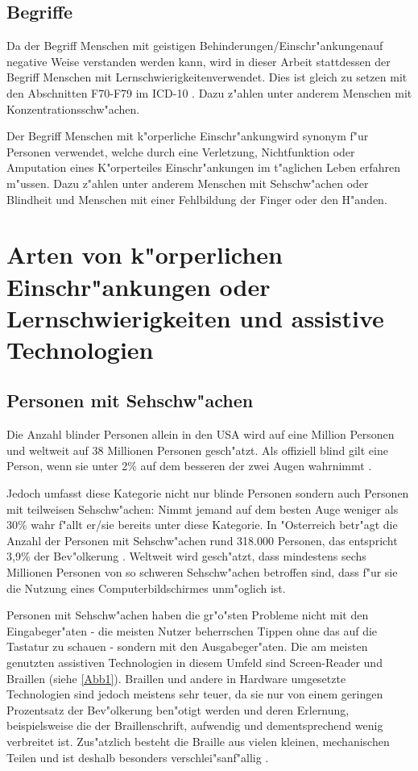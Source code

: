 \documentclass[a4paper,bibtotoc,oneside]{scrbook}
\begin{document}
\section{Begriffe}
Da der Begriff \glqq Menschen mit geistigen Behinderungen/Einschr"ankungen\grqq auf negative Weise verstanden werden kann, wird in dieser Arbeit stattdessen der Begriff \glqq Menschen mit Lernschwierigkeiten\grqq  verwendet. Dies ist gleich zu setzen mit den Abschnitten F70-F79 im ICD-10 \cite{icd10}. Dazu z"ahlen unter anderem Menschen mit Konzentrationsschw"achen.


Der Begriff \glqq Menschen mit k"orperliche Einschr"ankung\grqq wird synonym f"ur Personen verwendet, welche durch eine Verletzung, Nichtfunktion oder Amputation eines K"orperteiles Einschr"ankungen im t"aglichen Leben erfahren m"ussen. Dazu z"ahlen unter anderem Menschen mit Sehschw"achen oder Blindheit und Menschen mit einer Fehlbildung der Finger oder den H"anden.

\chapter{Arten von k"orperlichen Einschr"ankungen oder Lernschwierigkeiten
 und assistive Technologien}

\section{Personen mit Sehschw"achen}
Die Anzahl blinder Personen allein in den USA wird auf eine Million Personen und weltweit auf 38 Millionen Personen gesch"atzt\cite[S. 1]{screen_read}.  Als offiziell blind gilt eine Person, wenn sie unter 2\% auf dem besseren der zwei Augen wahrnimmt \cite[S. 12]{understand_acc}. 

Jedoch umfasst diese Kategorie nicht nur blinde Personen sondern auch Personen mit teilweisen Sehschw"achen: Nimmt jemand auf dem besten Auge weniger als 30\% wahr f"allt er/sie bereits unter diese Kategorie\cite[S. 12]{understand_acc}. In "Osterreich betr"agt die Anzahl der Personen mit Sehschw"achen rund 318.000 Personen, das entspricht 3,9\% der Bev"olkerung \cite[S. 13]{stat_austria}. Weltweit wird gesch"atzt, dass mindestens sechs Millionen Personen von so schweren Sehschw"achen betroffen sind, dass f"ur sie die Nutzung eines Computerbildschirmes unm"oglich ist\cite[S. 249]{screen_read_frust}.

Personen mit Sehschw"achen haben die gr"o"sten Probleme nicht mit den Eingabeger"aten - die meisten Nutzer beherrschen Tippen ohne das auf die Tastatur zu schauen - sondern mit den Ausgabeger"aten. Die am meisten genutzten assistiven Technologien in diesem Umfeld sind Screen-Reader und Braillen (siehe \ref{Abb1}). Braillen und andere in Hardware umgesetzte Technologien sind jedoch meistens sehr teuer, da sie nur von einem geringen Prozentsatz der Bev"olkerung ben"otigt werden und deren Erlernung, beispielsweise die der Braillenschrift, aufwendig und dementsprechend wenig verbreitet ist\cite[S. 249-250]{screen_read_frust}.
Zus"atzlich besteht die Braille aus vielen kleinen, mechanischen Teilen und ist deshalb besonders verschlei"sanf"allig \cite[S. 11]{barr_webd}.
\end{document}
